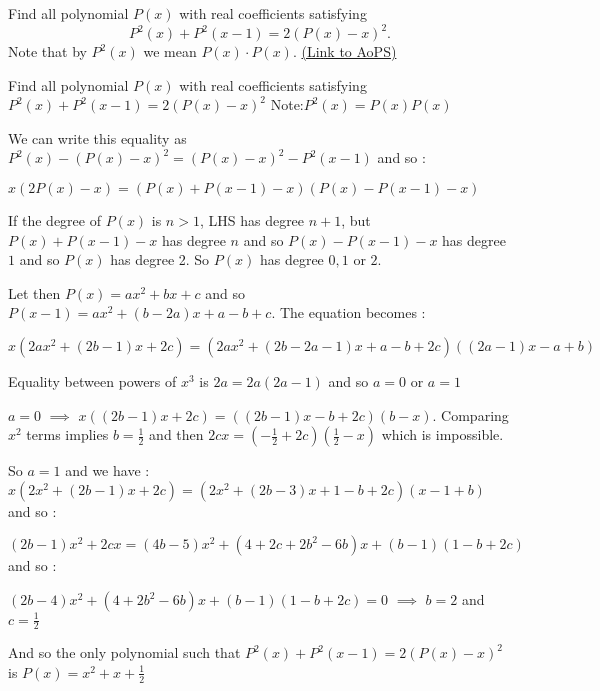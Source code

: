 \begin{problem}
	Find all polynomial $ P(x)$ with real coefficients satisfying $$ P^2(x)+P^2(x-1)=2(P(x)-x)^2.$$
Note that by $ P^2(x)$ we mean $P(x)\cdot P(x)$.
	\flushright \href{https://artofproblemsolving.com/community/c6h276670}{(Link to AoPS)}
\end{problem}



\begin{solution}
	\begin{tcolorbox}Find all polynomial $ P(x)$ with real coefficients satisfying $ P^2(x) + P^2(x - 1) = 2(P(x) - x)^2$
Note:$ P^2(x) = P(x)P(x)$\end{tcolorbox}

We can write this equality as $ P^2(x)-(P(x)-x)^2=(P(x)-x)^2-P^2(x-1)$ and so :

$ \boxed{x(2P(x)-x)=(P(x)+P(x-1)-x)(P(x)-P(x-1)-x)}$

If the degree of $ P(x)$ is $ n>1$, LHS has degree $ n+1$, but $ P(x)+P(x-1)-x$ has degree $ n$ and so $ P(x)-P(x-1)-x$ has degree $ 1$ and so $ P(x)$ has degree 2. So $ P(x)$ has degree $ 0,1$ or $ 2$.

Let then $ P(x)=ax^2+bx+c$ and so $ P(x-1)=ax^2+(b-2a)x+a-b+c$. The equation becomes :

$ x(2ax^2+(2b-1)x+2c)=(2ax^2+(2b-2a-1)x+a-b+2c)((2a-1)x-a+b)$

Equality between powers of $ x^3$ is $ 2a=2a(2a-1)$ and so $ a=0$ or $ a=1$

$ a=0$ $ \implies$ $ x((2b-1)x+2c)=((2b-1)x-b+2c)(b-x)$. Comparing $ x^2$ terms implies $ b=\frac{1}{2}$ and then $ 2cx=(-\frac{1}{2}+2c)(\frac{1}{2}-x)$ which is impossible.

So $ a=1$ and we have : $ x(2x^2+(2b-1)x+2c)=(2x^2+(2b-3)x+1-b+2c)(x-1+b)$ and so :

$ (2b-1)x^2+2cx=(4b-5)x^2+(4+2c+2b^2-6b)x  +(b-1) (1-b+2c)$ and so :

$ (2b-4)x^2+(4+2b^2-6b)x  +(b-1) (1-b+2c) = 0$ $ \implies$ $ b=2$ and $ c=\frac{1}{2}$

And so the only polynomial such that $ P^2(x) + P^2(x - 1) = 2(P(x) - x)^2$ is $ \boxed{P(x)=x^2+x+\frac{1}{2}}$
\end{solution}



